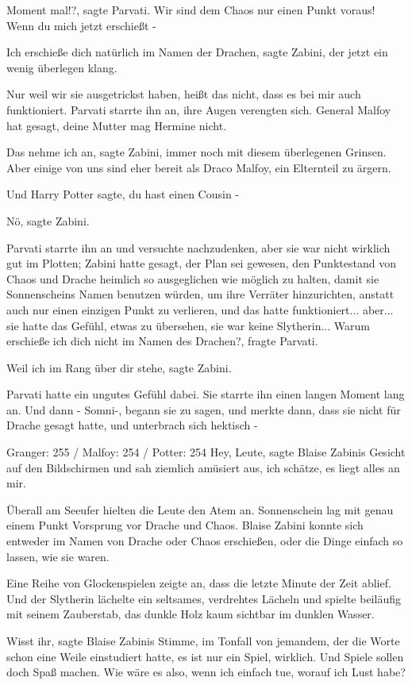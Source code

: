 \glqq{}Moment mal!?\grqq{}, sagte Parvati. \glqq{}Wir sind dem Chaos nur einen
Punkt voraus! Wenn du mich jetzt erschießt -\grqq{}

\glqq{}Ich erschieße dich natürlich im Namen der Drachen\grqq{}, sagte Zabini,
der jetzt ein wenig überlegen klang.

\glqq{}Nur weil wir sie ausgetrickst haben, heißt das nicht, dass es bei mir auch
funktioniert.\grqq{} Parvati starrte ihn an, ihre Augen verengten sich. \glqq{}
General Malfoy hat gesagt, deine Mutter mag Hermine nicht.\grqq{}

\glqq{}Das nehme ich an\grqq{}, sagte Zabini, immer noch mit diesem überlegenen
Grinsen. \glqq{}Aber einige von uns sind eher bereit als Draco Malfoy, ein
Elternteil zu ärgern.\grqq{}

\glqq{}Und Harry Potter sagte, du hast einen Cousin -\grqq{}

\glqq{}Nö\grqq{}, sagte Zabini.

Parvati starrte ihn an und versuchte nachzudenken, aber sie war nicht wirklich
gut im Plotten; Zabini hatte gesagt, der Plan sei gewesen, den Punktestand von
Chaos und Drache heimlich so ausgeglichen wie möglich zu halten, damit sie
Sonnenscheins Namen benutzen würden, um ihre Verräter hinzurichten, anstatt auch
nur einen einzigen Punkt zu verlieren, und das hatte funktioniert... aber... sie
hatte das Gefühl, etwas zu übersehen, sie war keine Slytherin... \glqq{}Warum
erschieße ich dich nicht im Namen des Drachen?\grqq{}, fragte Parvati.

\glqq{}Weil ich im Rang über dir stehe\grqq{}, sagte Zabini.

Parvati hatte ein ungutes Gefühl dabei. Sie starrte ihn einen langen Moment lang
an. Und dann - \glqq{}Somni-\grqq{}, begann sie zu sagen, und merkte dann, dass
sie nicht für Drache gesagt hatte, und unterbrach sich hektisch -

Granger: 255 / Malfoy: 254 / Potter: 254 \glqq{}Hey, Leute\grqq{}, sagte Blaise
Zabinis Gesicht auf den Bildschirmen und sah ziemlich amüsiert aus, \glqq{}ich
schätze, es liegt alles an mir.\grqq{}

Überall am Seeufer hielten die Leute den Atem an. Sonnenschein lag mit genau
einem Punkt Vorsprung vor Drache und Chaos. Blaise Zabini konnte sich entweder
im Namen von Drache oder Chaos erschießen, oder die Dinge einfach so lassen, wie
sie waren.

Eine Reihe von Glockenspielen zeigte an, dass die letzte Minute der Zeit ablief.
Und der Slytherin lächelte ein seltsames, verdrehtes Lächeln und spielte
beiläufig mit seinem Zauberstab, das dunkle Holz kaum sichtbar im dunklen
Wasser.

\glqq{}Wisst ihr\grqq{}, sagte Blaise Zabinis Stimme, im Tonfall von jemandem,
der die Worte schon eine Weile einstudiert hatte, \glqq{}es ist nur ein Spiel,
wirklich. Und Spiele sollen doch Spaß machen. Wie wäre es also, wenn ich einfach
tue, worauf ich Lust habe?\grqq{}

